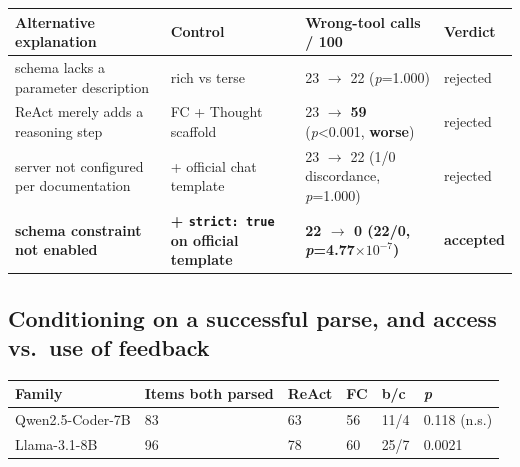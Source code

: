 \begin{center}
\begin{minipage}{\linewidth}
\centering
\small
{}\label{tab:controls}
\begin{tabular}{@{}p{.27\linewidth}p{.21\linewidth}p{.27\linewidth}p{}@{}}
\toprule
Alternative explanation & Control & Wrong-tool calls / 100 & Verdict \\
\midrule
schema lacks a parameter description & rich vs terse & 23 $\to$ 22 (\emph{p}=1.000) & rejected \\
ReAct merely adds a reasoning step & FC + Thought scaffold & 23 $\to$ \textbf{59} (\emph{p}\textless0.001, \textbf{worse}) & rejected \\
server not configured per documentation & + official chat template & 23 $\to$ 22 (1/0 discordance, \emph{p}=1.000) & rejected \\
\textbf{schema constraint not enabled} & \textbf{+ \texttt{strict: true} on official template} & \textbf{22 $\to$ 0 (22/0, \emph{p}=4.77$\times10^{-7}$)} & \textbf{accepted} \\
\bottomrule
\end{tabular}
\end{minipage}
\end{center}

\subsection{Conditioning on a successful parse, and access vs.\ use of feedback}
\label{app:conditioned}

\begin{center}
\begin{minipage}{\linewidth}
\centering
\small
{}\label{tab:conditioned}
\begin{tabular}{@{}llllll@{}}
\toprule
Family & Items both parsed & ReAct & FC & b/c & \emph{p} \\
\midrule
Qwen2.5-Coder-7B & 83 & 63 & 56 & 11/4 & 0.118 (n.s.) \\
Llama-3.1-8B & 96 & 78 & 60 & 25/7 & 0.0021 \\
\bottomrule
\end{tabular}
\end{minipage}
\end{center}

